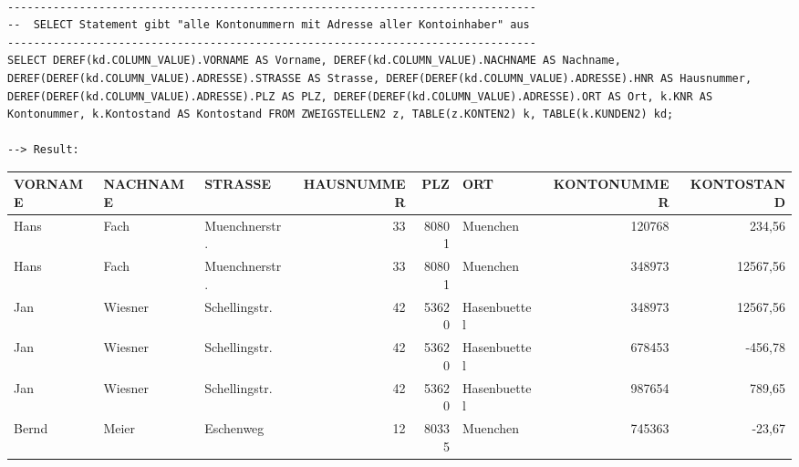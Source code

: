 \documentclass{scrartcl}
\begin{document}
\begin{landscape}
\begin{lstlisting}

---------------------------------------------------------------------------------
--  SELECT Statement gibt "alle Kontonummern mit Adresse aller Kontoinhaber" aus
---------------------------------------------------------------------------------
SELECT DEREF(kd.COLUMN_VALUE).VORNAME AS Vorname, DEREF(kd.COLUMN_VALUE).NACHNAME AS Nachname, DEREF(DEREF(kd.COLUMN_VALUE).ADRESSE).STRASSE AS Strasse, DEREF(DEREF(kd.COLUMN_VALUE).ADRESSE).HNR AS Hausnummer, DEREF(DEREF(kd.COLUMN_VALUE).ADRESSE).PLZ AS PLZ, DEREF(DEREF(kd.COLUMN_VALUE).ADRESSE).ORT AS Ort, k.KNR AS Kontonummer, k.Kontostand AS Kontostand FROM ZWEIGSTELLEN2 z, TABLE(z.KONTEN2) k, TABLE(k.KUNDEN2) kd;

--> Result:
\end{lstlisting}
\begin{tabular}{ l l l r r l r r }
VORNAME      &        NACHNAME     &        STRASSE                &        HAUSNUMMER    &    PLZ & ORT          &        KONTONUMMER & KONTOSTAND \\
\hline
Hans        &         Fach        &         Muenchnerstr.             &              33   &   80801 & Muenchen   &                120768  &   234,56 \\
Hans       &          Fach      &           Muenchnerstr.       &                    33    &  80801  & Muenchen      &             348973 &   12567,56 \\
Jan          &        Wiesner       &       Schellingstr.            &              42    &  53620 & Hasenbuettel    &           348973  & 12567,56 \\
Jan        &          Wiesner    &          Schellingstr.   &                       42  &    53620 & Hasenbuettel   &            678453  &  -456,78 \\
Jan           &       Wiesner      &        Schellingstr.      &                    42   &   53620 & Hasenbuettel       &        987654  &   789,65 \\
Bernd      &          Meier     &           Eschenweg   &                           12    &  80335 & Muenchen              &     745363   &  -23,67 \\
\end{tabular}

\end{landscape}
		
\end{document}
